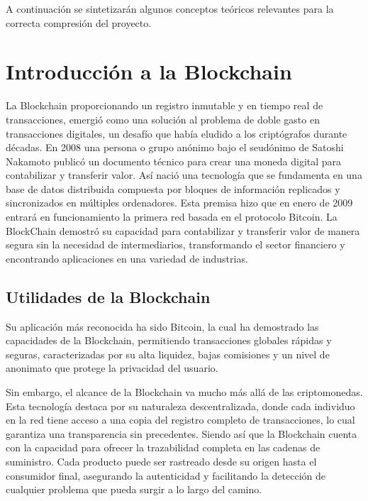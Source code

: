
A continuación se sintetizarán algunos conceptos teóricos relevantes para la correcta compresión del proyecto.



\section{Introducción a la Blockchain}

La Blockchain proporcionando un registro inmutable y en tiempo real de transacciones, emergió como una solución al problema de doble gasto en transacciones digitales, un desafío que había eludido a los criptógrafos durante décadas.
En 2008 una persona o grupo anónimo bajo el seudónimo de Satoshi Nakamoto publicó un documento técnico para crear una moneda digital para contabilizar y transferir valor. Así nació una tecnología que se fundamenta en una base de datos distribuida compuesta por bloques de información replicados y sincronizados en múltiples ordenadores.  
Esta premisa hizo que en enero de 2009 entrará en funcionamiento la primera red basada en el protocolo Bitcoin.
La BlockChain demostró su capacidad para contabilizar y transferir valor de manera segura sin la necesidad de intermediarios, transformando el sector financiero y encontrando aplicaciones en una variedad de industrias.


\subsection{Utilidades de la Blockchain}

Su aplicación más reconocida ha sido Bitcoin, la cual ha demostrado las capacidades de la Blockchain, permitiendo transacciones globales rápidas y seguras, caracterizadas por su alta liquidez, bajas comisiones y un nivel de anonimato que protege la privacidad del usuario.

Sin embargo, el alcance de la Blockchain va mucho más allá de las criptomonedas. Esta tecnología destaca por su naturaleza descentralizada, donde cada individuo en la red tiene acceso a una copia del registro completo de transacciones, lo cual garantiza una transparencia sin precedentes. Siendo así que la Blockchain cuenta con la capacidad para ofrecer la trazabilidad completa en las cadenas de suministro. Cada producto puede ser rastreado desde su origen hasta el consumidor final, asegurando la autenticidad y facilitando la detección de cualquier problema que pueda surgir a lo largo del camino.

